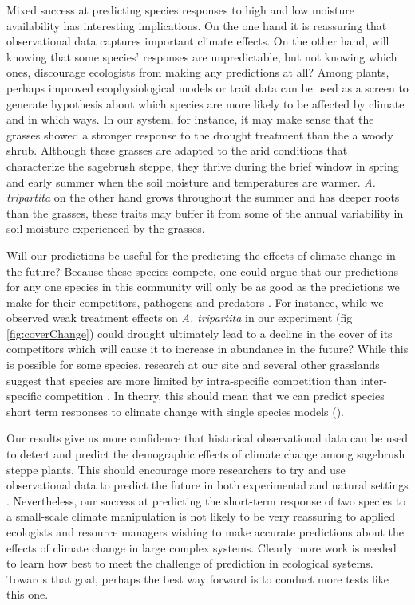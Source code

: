 \documentclass[11pt]{article}
\begin{document}
\begin{doublespacing}
Mixed success at predicting species responses to high and low moisture availability has interesting implications.  On the one hand it is reassuring that observational data captures important climate effects. On the other hand, will knowing that some species' responses are unpredictable, but not knowing which ones, discourage ecologists from making any predictions at all? Among plants, perhaps improved ecophysiological models or trait data can be used as a screen to generate hypothesis about which species are more likely to be affected by climate and in which ways. In our system, for instance, it may make sense that the grasses showed a stronger response to the drought treatment than the a woody shrub. Although these grasses are adapted to the arid conditions that characterize the sagebrush steppe, they thrive during the brief window in spring and early summer when the soil moisture and temperatures are warmer.  \textit{A. tripartita} on the other hand grows throughout the summer and has deeper roots than the grasses, these traits may buffer it from some of the annual variability in soil moisture experienced by the grasses. 

Will our predictions be useful for the predicting the effects of climate change in the future? Because these species compete, one could argue that our predictions for any one species in this community will only be as good as the predictions we make for their competitors, pathogens and predators \citep{tylianakis_global_2008}. For instance, while we observed weak treatment effects on \textit{A. tripartita} in our experiment (fig \ref{fig:coverChange}) could drought ultimately lead to a decline in the cover of its competitors which will cause it to increase in abundance in the future?  While this is possible for some species, research at our site and several other grasslands suggest that species are more limited by intra-specific competition than inter-specific competition \cite{chu_direct_2016,adler_weak_2016}. In theory, this should mean that we can predict species short term responses to climate change with single species models (\citep{levine_competitors_2010,kleinhesselink_indirect_2015,adler_forecasting_2012}).  

Our results give us more confidence that historical observational data can be used to detect and predict the demographic effects of climate change among sagebrush steppe plants. This should encourage more researchers to try and use observational data to predict the future in both experimental and natural settings \citep{houlahan_priority_2016}. Nevertheless, our success at predicting the short-term response of two species to a small-scale climate manipulation is not likely to be very reassuring to applied ecologists and resource managers wishing to make accurate predictions about the effects of climate change in large complex systems. Clearly more work is needed to learn how best to meet the challenge of prediction in ecological systems. Towards that goal, perhaps the best way forward is to conduct more tests like this one.   
  

\end{doublespacing}
\end{document}
